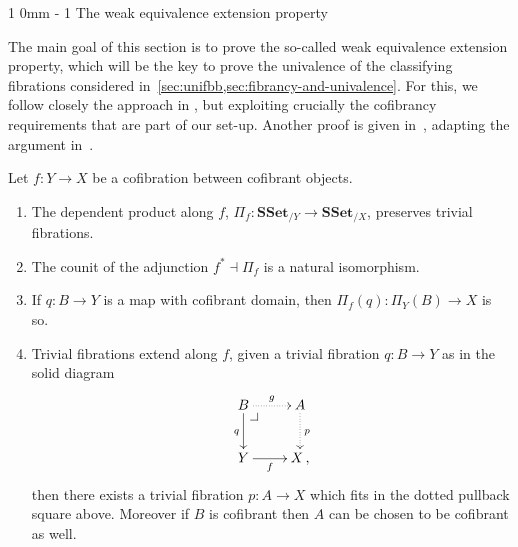 \documentclass[reqno,10pt,a4paper,oneside,draft]{amsart}
\makeatletter
\renewcommand{\section}{\@startsection
{section}%
{1}%
{0mm}%
{-\baselineskip}%
{1\baselineskip}%
{\Large \bfseries}}%
\numberwithin{equation}{section}
\theoremstyle{mythm}
\theoremstyle{mydef}
\theoremstyle{myrmk}
\newcommand{\pullback}[1]{\save*!/#1-1.2pc/#1:(-1,1)@^{|-}\restore}
\newcommand{\drpullback}{\pullback{dr}}
\newcommand{\ie}{\text{i.e.\ }}
\newcommand{\co}{\colon}
\newcommand{\SSet}{\mathbf{SSet}}
\makeatother
\begin{document}
\section{The weak equivalence extension property}
\label{sec:equep}

The main goal of this section is to prove the so-called weak equivalence extension property, which will be the key to prove the univalence of the classifying fibrations considered in~\cref{sec:unifbb,sec:fibrancy-and-univalence}.  For this, we follow closely the approach in \cite{voevodsky-simplicial-model}, but exploiting crucially the cofibrancy requirements that are part of our set-up. Another proof is given in~\cite[Section~3.2]{GambinoN:anocp}, adapting the argument in~\cite{SattlerC:equepu}.



\begin{lemma}\label{Lemma:ForTheExtProperty} Let  $f \co Y \rightarrow X$ be a cofibration between
cofibrant objects. 
\begin{enumerate}[$(i)$]
\item The dependent product along $f$, $\Pi_f \co \SSet_{/Y} \rightarrow \SSet_{/X}$, preserves trivial fibrations.
\item The counit of the adjunction $f^* \dashv \Pi_f$ is a natural isomorphism.
\item If $q \co B \to Y$ is a map with cofibrant domain, then $\Pi_f(q) \co \Pi_Y(B) \to X$  is so.
\item Trivial fibrations extend along $f$, \ie given a trivial fibration $q
 \co B \to Y$  as in the solid diagram
\[
\xymatrix{
B \ar@{.>}[r]^{g} \ar[d]_{q} \drpullback  & A \ar@{.>}[d]^{p} \\
Y \ar[r]_-f &  X \, ,}
\]
then there exists a trivial fibration $p \co A \rightarrow X$ which fits in the dotted pullback square above. Moreover if $B$ is cofibrant  then 
$A$ can be chosen to be 
cofibrant as well.
\end{enumerate}
\end{lemma}
\end{document}
